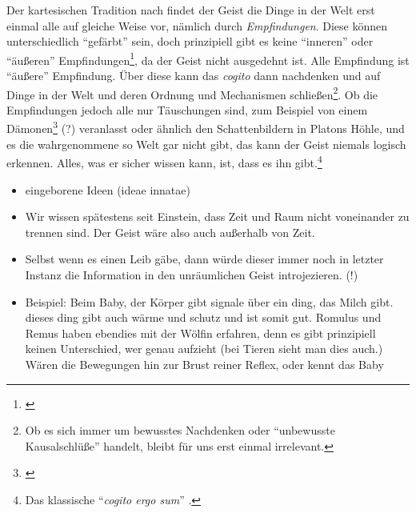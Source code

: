 \documentclass[a4paper, 12pt]{article}
\begin{document}
\begin{onehalfspace}

Der kartesischen Tradition nach findet der Geist die Dinge in der Welt erst einmal alle auf gleiche Weise vor, nämlich durch \emph{Empfindungen}. Diese können unterschiedlich "`gefärbt"' sein, doch prinzipiell gibt es keine "`inneren"' oder "`äußeren"' Empfindungen\footnote{\Cite[Vgl.][S. ?? (501?)]{scheler-ethik}}, da der Geist nicht ausgedehnt ist. Alle Empfindung ist "`äußere"' Empfindung. Über diese kann das \emph{cogito} dann nachdenken und auf Dinge in der Welt und deren Ordnung und Mechanismen schließen\footnote{Ob es sich immer um bewusstes Nachdenken oder "`unbewusste Kausalschlüße"' handelt, bleibt für uns erst einmal irrelevant.}. Ob die Empfindungen jedoch alle nur Täuschungen sind, zum Beispiel von einem Dämonen\footnote{\Cite[Vgl.][S.?]{descartes}} (?) veranlasst oder ähnlich den Schattenbildern in Platons Höhle, und es die wahrgenommene so Welt gar nicht gibt, das kann der Geist niemals logisch erkennen. Alles, was er sicher wissen kann, ist, dass es ihn gibt.\footnote{Das klassische "`\emph{cogito ergo sum}"' .}



\begin{itemize}
  \item eingeborene Ideen (ideae innatae)
  \item Wir wissen spätestens seit Einstein, dass Zeit und Raum nicht voneinander zu trennen sind. Der Geist wäre also auch außerhalb von Zeit. 
  \item Selbst wenn es einen Leib gäbe, dann würde dieser immer noch in letzter Instanz die Information in den unräumlichen Geist introjezieren. (!)
  \item Beispiel: Beim Baby, der Körper gibt signale über ein ding, das Milch gibt. dieses ding gibt auch wärme und schutz und ist somit gut. Romulus und Remus haben ebendies mit der Wölfin erfahren, denn es gibt prinzipiell keinen Unterschied, wer genau aufzieht (bei Tieren sieht man dies auch.) Wären die Bewegungen hin zur Brust reiner Reflex, oder kennt das Baby 
\end{itemize}


\end{onehalfspace}
\end{document}
